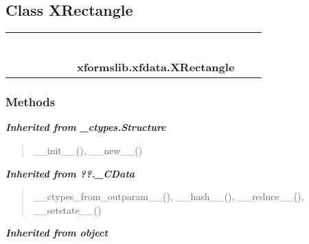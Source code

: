 \subsection{Class XRectangle}

    \label{xformslib:xfdata:XRectangle}
\begin{tabular}{cccccccccc}
\multicolumn{2}{r}{\settowidth{\BCL}{object}\multirow{2}{\BCL}{object}}
&&
&&
&&
  \\\cline{3-3}
  &&\multicolumn{1}{c|}{}
&&
&&
&&
  \\
\multicolumn{4}{r}{\settowidth{\BCL}{??.\_CData}\multirow{2}{\BCL}{??.\_CData}}
&&
&&
  \\\cline{5-5}
  &&&&\multicolumn{1}{c|}{}
&&
&&
  \\
\multicolumn{6}{r}{\settowidth{\BCL}{\_ctypes.Structure}\multirow{2}{\BCL}{\_ctypes.Structure}}
&&
  \\\cline{7-7}
  &&&&&&\multicolumn{1}{c|}{}
&&
  \\
&&&&&&\multicolumn{2}{l}{\textbf{xformslib.xfdata.XRectangle}}
\end{tabular}



  \subsubsection{Methods}


\large{\textbf{\textit{Inherited from \_ctypes.Structure}}}

\begin{quote}
\_\_init\_\_(), \_\_new\_\_()
\end{quote}

\large{\textbf{\textit{Inherited from ??.\_CData}}}

\begin{quote}
\_\_ctypes\_from\_outparam\_\_(), \_\_hash\_\_(), \_\_reduce\_\_(), \_\_setstate\_\_()
\end{quote}

\large{\textbf{\textit{Inherited from object}}}

